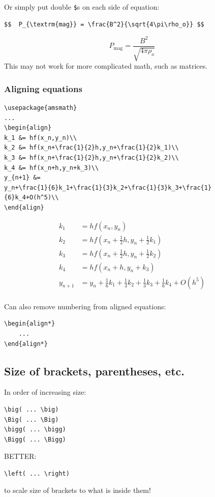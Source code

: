 \documentclass{article}
\begin{document}
Or simply put double \verb|$|s on each side of equation:
\begin{verbatim}
$$  P_{\textrm{mag}} = \frac{B^2}{\sqrt{4\pi\rho_o}} $$
\end{verbatim}
$$  P_{\textrm{mag}} = \frac{B^2}{\sqrt{4\pi\rho_o}} $$
This may not work for more complicated math, such as matrices.

\subsubsection{Aligning equations}
\begin{verbatim}
\usepackage{amsmath}
...
\begin{align}
k_1 &= hf(x_n,y_n)\\
k_2 &= hf(x_n+\frac{1}{2}h,y_n+\frac{1}{2}k_1)\\
k_3 &= hf(x_n+\frac{1}{2}h,y_n+\frac{1}{2}k_2)\\
k_4 &= hf(x_n+h,y_n+k_3)\\
y_{n+1} &=
y_n+\frac{1}{6}k_1+\frac{1}{3}k_2+\frac{1}{3}k_3+\frac{1}{6}k_4+O(h^5)\\
\end{align}
\end{verbatim}
\begin{align}
k_1 &= hf(x_n,y_n)\\
k_2 &= hf(x_n+\frac{1}{2}h,y_n+\frac{1}{2}k_1)\\
k_3 &= hf(x_n+\frac{1}{2}h,y_n+\frac{1}{2}k_2)\\
k_4 &= hf(x_n+h,y_n+k_3)\\
y_{n+1} &=
y_n+\frac{1}{6}k_1+\frac{1}{3}k_2+\frac{1}{3}k_3+\frac{1}{6}k_4+O(h^5)\\
\end{align}

Can also remove numbering from aligned equations:
\begin{verbatim}
\begin{align*}
    ...
\end{align*}
\end{verbatim}

\subsection{Size of brackets, parentheses, etc.}
In order of increasing size:
\begin{verbatim}
\big( ... \big)
\Big( ... \Big)
\bigg( ... \bigg)
\Bigg( ... \Bigg)
\end{verbatim}
BETTER\@:
\begin{verbatim}
\left( ... \right)
\end{verbatim}
to scale size of brackets to what is inside them!
\end{document}
